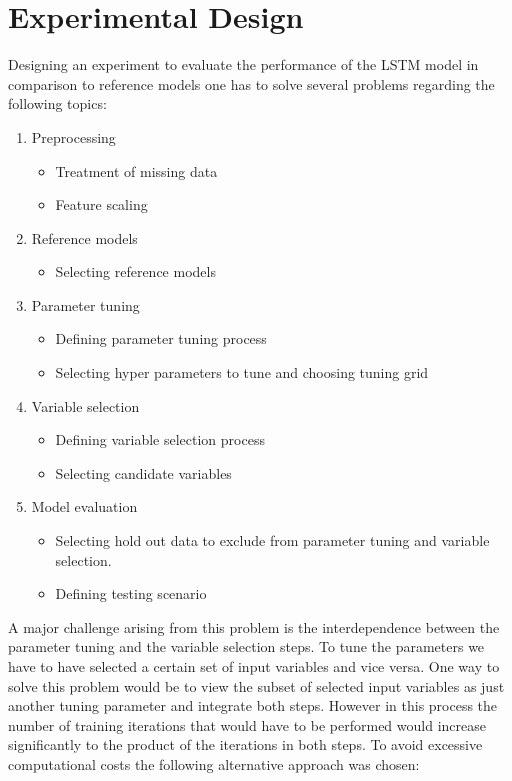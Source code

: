 \section{Experimental Design}
Designing an experiment to evaluate the performance of the LSTM model in comparison to reference models one has to solve several problems regarding the following topics:
\begin{enumerate}
\item Preprocessing\begin{itemize}
	\item Treatment of missing data
	\item Feature scaling
\end{itemize}
\item Reference models\begin{itemize}
	\item Selecting reference models
\end{itemize}
\item Parameter tuning \begin{itemize}
	\item Defining parameter tuning process
	\item Selecting hyper parameters to tune and choosing tuning grid
\end{itemize}
\item Variable selection \begin{itemize}
	\item Defining variable selection process
	\item Selecting candidate variables
\end{itemize}
\item Model evaluation \begin{itemize}
\item Selecting hold out data to exclude from parameter tuning and variable selection.
\item Defining testing scenario
\end{itemize}	
\end{enumerate}

A major challenge arising from this problem is the interdependence between the parameter tuning and the variable selection steps. To tune the parameters we have to have selected a certain set of input variables and vice versa. One way to solve this problem would be to view the subset of selected input variables as just another tuning parameter and integrate both steps. However in this process the number of training iterations that would have to be performed would increase significantly to the product of the iterations in both steps. To avoid excessive computational costs the following alternative approach was chosen:

